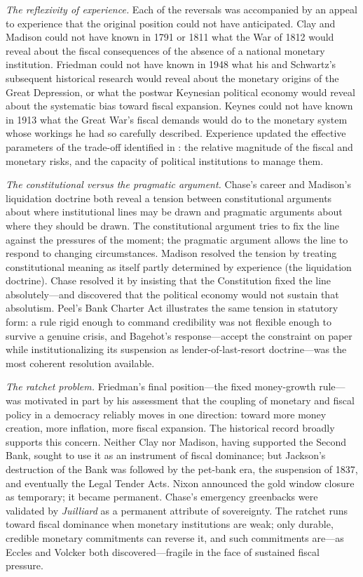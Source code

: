 \documentclass[12pt]{article}
\begin{document}
\textit{The reflexivity of experience.}  Each of the reversals was
accompanied by an appeal to experience that the original position could
not have anticipated.  Clay and Madison could not have known in 1791 or
1811 what the War of 1812 would reveal about the fiscal consequences of
the absence of a national monetary institution.  Friedman could not have
known in 1948 what his and Schwartz's subsequent historical research
would reveal about the monetary origins of the Great Depression, or
what the postwar Keynesian political economy would reveal about the
systematic bias toward fiscal expansion.  Keynes could not have known
in 1913 what the Great War's fiscal demands would do to the monetary
system whose workings he had so carefully described.  Experience updated
the effective parameters of the trade-off identified in
\citet{Sargent2011}: the relative magnitude of the fiscal and monetary
risks, and the capacity of political institutions to manage them.

\textit{The constitutional versus the pragmatic argument.}  Chase's
career and Madison's liquidation doctrine both reveal a tension between
constitutional arguments about where institutional lines may be drawn
and pragmatic arguments about where they should be drawn.  The
constitutional argument tries to fix the line against the pressures of
the moment; the pragmatic argument allows the line to respond to
changing circumstances.  Madison resolved the tension by treating
constitutional meaning as itself partly determined by experience
(the liquidation doctrine).  Chase resolved it by insisting that the
Constitution fixed the line absolutely---and discovered that the
political economy would not sustain that absolutism.  Peel's Bank
Charter Act illustrates the same tension in statutory form: a rule rigid
enough to command credibility was not flexible enough to survive a
genuine crisis, and Bagehot's response---accept the constraint on paper
while institutionalizing its suspension as lender-of-last-resort
doctrine---was the most coherent resolution available.

\textit{The ratchet problem.}  Friedman's final position---the fixed
money-growth rule---was motivated in part by his assessment that the
coupling of monetary and fiscal policy in a democracy reliably moves
in one direction: toward more money creation, more inflation, more
fiscal expansion.  The historical record broadly supports this concern.
Neither Clay nor Madison, having supported the Second Bank, sought to
use it as an instrument of fiscal dominance; but Jackson's destruction
of the Bank was followed by the pet-bank era, the suspension of 1837,
and eventually the Legal Tender Acts.  Nixon announced the gold window
closure as temporary; it became permanent.  Chase's emergency greenbacks
were validated by \textit{Juilliard} as a permanent attribute of
sovereignty.  The ratchet runs toward fiscal dominance when monetary
institutions are weak; only durable, credible monetary commitments can
reverse it, and such commitments are---as Eccles and Volcker both
discovered---fragile in the face of sustained fiscal pressure.
\end{document}
